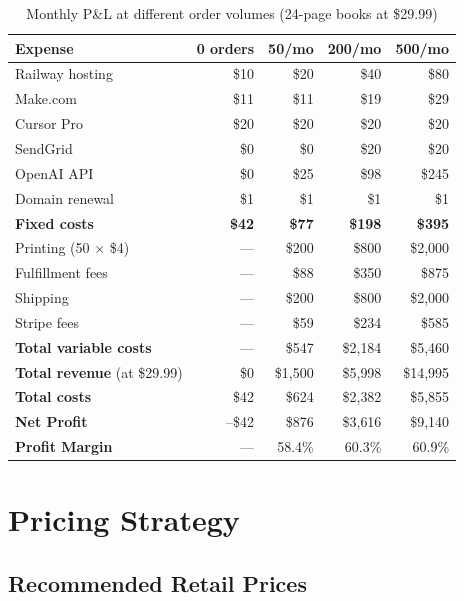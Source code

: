 \documentclass[12pt, letterpaper, oneside]{book}
\begin{document}
\begin{table}[H]
\centering
\small
\begin{tabularx}{\textwidth}{Xrrrr}
\toprule
\textbf{Expense} & \textbf{0 orders} & \textbf{50/mo} & \textbf{200/mo} & \textbf{500/mo} \\
\midrule
Railway hosting & \$10 & \$20 & \$40 & \$80 \\
Make.com & \$11 & \$11 & \$19 & \$29 \\
Cursor Pro & \$20 & \$20 & \$20 & \$20 \\
SendGrid & \$0 & \$0 & \$20 & \$20 \\
OpenAI API & \$0 & \$25 & \$98 & \$245 \\
Domain renewal & \$1 & \$1 & \$1 & \$1 \\
\midrule
\textbf{Fixed costs} & \textbf{\$42} & \textbf{\$77} & \textbf{\$198} & \textbf{\$395} \\
\midrule
Printing (50 $\times$ \$4) & --- & \$200 & \$800 & \$2{,}000 \\
Fulfillment fees & --- & \$88 & \$350 & \$875 \\
Shipping & --- & \$200 & \$800 & \$2{,}000 \\
Stripe fees & --- & \$59 & \$234 & \$585 \\
\midrule
\textbf{Total variable costs} & --- & \$547 & \$2{,}184 & \$5{,}460 \\
\midrule
\textbf{Total revenue} (at \$29.99) & \$0 & \$1{,}500 & \$5{,}998 & \$14{,}995 \\
\textbf{Total costs} & \$42 & \$624 & \$2{,}382 & \$5{,}855 \\
\textbf{Net Profit} & \textcolor{danger}{--\$42} & \textcolor{success}{\$876} & \textcolor{success}{\$3{,}616} & \textcolor{success}{\$9{,}140} \\
\textbf{Profit Margin} & --- & 58.4\% & 60.3\% & 60.9\% \\
\bottomrule
\end{tabularx}
\caption{Monthly P\&L at different order volumes (24-page books at \$29.99)}
\end{table}


\chapter{Pricing Strategy}

\section{Recommended Retail Prices}
\end{document}

